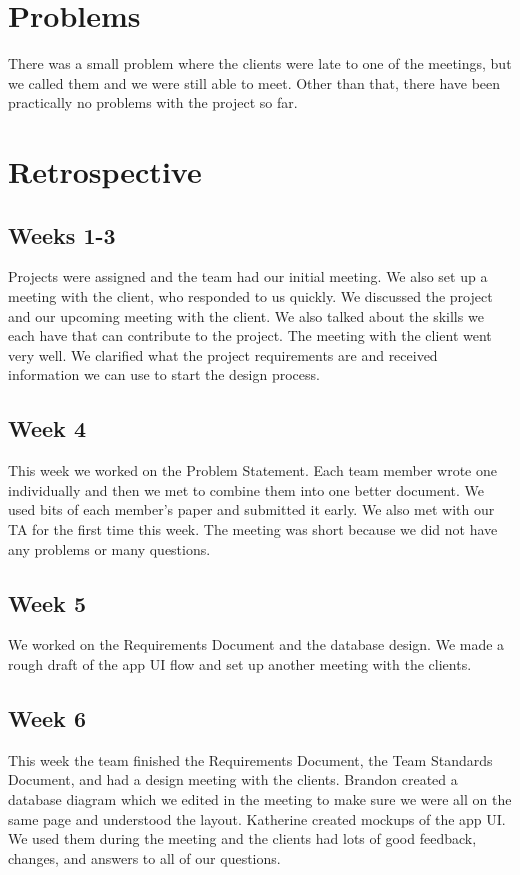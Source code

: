 \documentclass[onecolumn, draftclsnofoot,10pt, compsoc]{IEEEtran}
\begin{document}
\section{Problems}
There was a small problem where the clients were late to one of the meetings, but we called them and we were still able to meet. Other than that, there have been practically no problems with the project so far. 


\section{Retrospective}
\subsection{Weeks 1-3}
Projects were assigned and the team had our initial meeting. We also set up a meeting with the client, who responded to us quickly. We discussed the project and our upcoming meeting with the client. We also talked about the skills we each have that can contribute to the project. The meeting with the client went very well. We clarified what the project requirements are and received information we can use to start the design process. 

\subsection{Week 4}
This week we worked on the Problem Statement. Each team member wrote one individually and then we met to combine them into one better document. We used bits of each member’s paper and submitted it early. We also met with our TA for the first time this week. The meeting was short because we did not have any problems or many questions.


\subsection{Week 5}
We worked on the Requirements Document and the database design. We made a rough draft of the app UI flow and set up another meeting with the clients. 

\subsection{Week 6}
This week the team finished the Requirements Document, the Team Standards Document, and had a design meeting with the clients. Brandon created a database diagram which we edited in the meeting to make sure we were all on the same page and understood the layout. Katherine created mockups of the app UI. We used them during the meeting and the clients had lots of good feedback, changes, and answers to all of our questions. 
\end{document}
